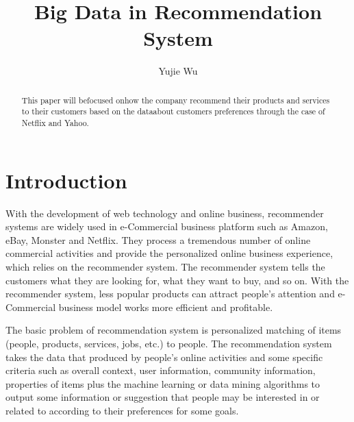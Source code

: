\documentclass[sigconf]{acmart}
\begin{document}
\title{Big Data in Recommendation System}


\author{Yujie Wu}



\renewcommand{\shortauthors}{B. Trovato et al.}


\begin{abstract}
\large This paper will befocused onhow the company recommend their products and services to their customers based on the dataabout customer\textquotesingle s preferences through the case of Netflix and Yahoo. 
\end{abstract}


\maketitle

\section{Introduction}
\large With the development of web technology and online business, recommender systems are widely used in e-Commercial business platform such as Amazon, eBay, Monster and Netflix. They process a tremendous number of online commercial activities and provide the personalized online business experience, which relies on the recommender system.  The recommender system tells the customers what they are looking for, what they want to buy, and so on. With the recommender system, less popular products can attract people’s attention and e-Commercial business model works more efficient and profitable. 
\par
The basic problem of recommendation system is personalized matching of items (people, products, services, jobs, etc.) to people\cite{Reco1}. The recommendation system takes the data that produced by people’s online activities and some specific criteria such as overall context, user information, community information, properties of items plus the machine learning or data mining algorithms to output some information or suggestion that people may be interested in or related to according to their preferences for some goals\cite{Reco1}. 
\end{document}
